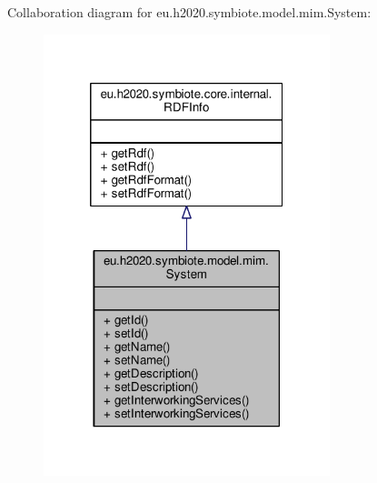 Collaboration diagram for eu.\+h2020.\+symbiote.\+model.\+mim.\+System\+:
\nopagebreak
\begin{figure}[H]
\begin{center}
\leavevmode
\includegraphics[width=236pt]{classeu_1_1h2020_1_1symbiote_1_1model_1_1mim_1_1System__coll__graph}
\end{center}
\end{figure}
